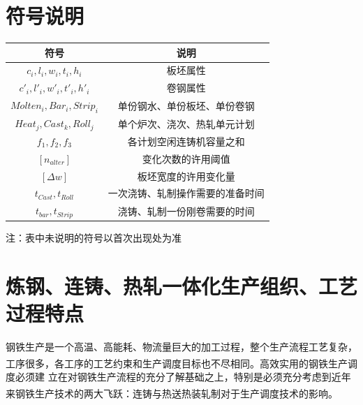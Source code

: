 \documentclass{whutmod}
\newcommand{\upcite}[1]{\textsuperscript{\cite{#1}}}
\begin{document}
	\section{符号说明}
		\begin{table}[H]
		\centering
		\setlength{\tabcolsep}{12mm}
		\begin{tabular}{cc}
			\toprule[1.5pt]
			\multicolumn{1}{m{4cm}}{\centering 符号} & \multicolumn{1}{m{6cm}}{\centering 说明} \\
			\midrule[1pt]		
			$c_i, l_i, w_i, t_i, h_i$  & 板坯属性  \\ 
				$c'_i, l'_i, w'_i, t'_i, h'_i$  & 卷钢属性  \\ 
		   	$Molten_i, Bar_i, Strip_i$  & 单份钢水、单份板坯、单份卷钢  \\
		   	$Heat_j, Cast_k, Roll_j$  & 单个炉次、浇次、热轧单元计划  \\ 
		 $f_1, f_2, f_3$  & 各计划空闲连铸机容量之和 \\   
		  $[n_{alter}]$  & 变化次数的许用阈值 \\   
		   $[\Delta w]$  & 板坯宽度的许用变化量 \\
		 $t_{Cast}, t_{Roll}$  & 一次浇铸、轧制操作需要的准备时间 \\  
		 $t_{bar}, t_{Strip}$  & 浇铸、轧制一份刚卷需要的时间 \\     
			\bottomrule[1.5pt]
		\end{tabular}
		\begin{tablenotes}
		\item 注：表中未说明的符号以首次出现处为准
		\end{tablenotes}
		\end{table}

	
	\newpage
	\section{炼钢、连铸、热轧一体化生产组织、工艺过程特点}
	 钢铁生产是一个高温、高能耗、物流量巨大的加工过程，整个生产流程工艺复杂，工序很多，各工序的工艺约束和生产调度目标也不尽相同\upcite{1,2}。高效实用的钢铁生产调度必须建 立在对钢铁生产流程的充分了解基础之上，特别是必须充分考虑到近年来钢铁生产技术的两大飞跃：连铸与热送热装轧制对于生产调度技术的影响\upcite{1,3,4}。
	 
\end{document}
